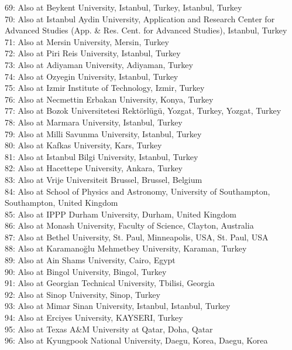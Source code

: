 $$69: Also at Beykent University, Istanbul, Turkey, Istanbul, Turkey\\
70: Also at Istanbul Aydin University, Application and Research Center for Advanced Studies (App. \& Res. Cent. for Advanced Studies), Istanbul, Turkey\\
71: Also at Mersin University, Mersin, Turkey\\
72: Also at Piri Reis University, Istanbul, Turkey\\
73: Also at Adiyaman University, Adiyaman, Turkey\\
74: Also at Ozyegin University, Istanbul, Turkey\\
75: Also at Izmir Institute of Technology, Izmir, Turkey\\
76: Also at Necmettin Erbakan University, Konya, Turkey\\
77: Also at Bozok Universitetesi Rekt\"{o}rl\"{u}g\"{u}, Yozgat, Turkey, Yozgat, Turkey\\
78: Also at Marmara University, Istanbul, Turkey\\
79: Also at Milli Savunma University, Istanbul, Turkey\\
80: Also at Kafkas University, Kars, Turkey\\
81: Also at Istanbul Bilgi University, Istanbul, Turkey\\
82: Also at Hacettepe University, Ankara, Turkey\\
83: Also at Vrije Universiteit Brussel, Brussel, Belgium\\
84: Also at School of Physics and Astronomy, University of Southampton, Southampton, United Kingdom\\
85: Also at IPPP Durham University, Durham, United Kingdom\\
86: Also at Monash University, Faculty of Science, Clayton, Australia\\
87: Also at Bethel University, St. Paul, Minneapolis, USA, St. Paul, USA\\
88: Also at Karamano\u{g}lu Mehmetbey University, Karaman, Turkey\\
89: Also at Ain Shams University, Cairo, Egypt\\
90: Also at Bingol University, Bingol, Turkey\\
91: Also at Georgian Technical University, Tbilisi, Georgia\\
92: Also at Sinop University, Sinop, Turkey\\
93: Also at Mimar Sinan University, Istanbul, Istanbul, Turkey\\
94: Also at Erciyes University, KAYSERI, Turkey\\
95: Also at Texas A\&M University at Qatar, Doha, Qatar\\
96: Also at Kyungpook National University, Daegu, Korea, Daegu, Korea\\
